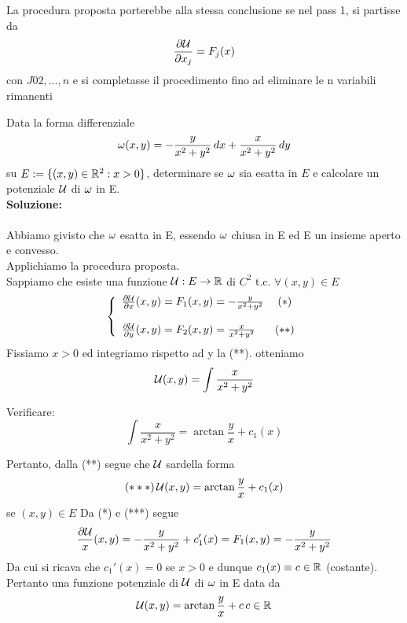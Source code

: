 \begin{osservazione}
  La procedura proposta porterebbe alla stessa conclusione se nel pass 1, si partisse da 
  $$\frac{\partial \mathcal{U}}{\partial x_j} = F_j(x)$$
  con $J02,...,n$
  e si completasse il procedimento fino ad eliminare le n variabili rimanenti
\end{osservazione}
\begin{exercise}
  Data la forma differenziale
  $$\omega(x,y) = -\frac{y}{x^2+y^2}\,dx + \frac{x}{x^2+y^2}\,dy$$
  su $E:=\{(x,y)\in\mathbb{R}^2: x>0\}$, determinare se $\omega$ sia esatta in $E$ e calcolare 
  un potenziale $\mathcal{U}$ di $\omega$ in E. \\
  \textbf{Soluzione:} \\\\
  Abbiamo gi\aca visto che $\omega$ \ace esatta in E, essendo $\omega$ chiusa in E ed 
  E un insieme aperto e convesso. \\
  Applichiamo la procedura proposta. \\
  Sappiamo che esiste una funzione $\mathcal{U}:E\to\mathbb{R}$ di $C^2$ t.c. $\forall (x,y)\in E$
  $$\left\{\begin{array}{lc}
    \frac{\partial\mathcal{U}}{\partial x}(x,y) = F_1(x,y) = -\frac{y}{x^2+y^2} & (*) \\
    \\
    \frac{\partial\mathcal{U}}{\partial y}(x,y) = F_2(x,y) = \frac{x}{x^2+y^2} & (**) \\
  \end{array}\right.$$
  Fissiamo $x>0$ ed integriamo rispetto ad y la (**). otteniamo
  $$\mathcal{U}(x,y) = \int \frac{x}{x^2+y^2}$$
  \begin{exercise}
    Verificare:
    $$\int \frac{x}{x^2+y^2} = \arctan\frac{y}{x} + c_1(x)$$
  \end{exercise}
  Pertanto, dalla (**) segue che $\mathcal{U}$ sar\aca della forma 
  $$(***)\, \mathcal{U}(x,y) = \arctan\frac{y}{x} + c_1(x)$$
  se $(x,y)\in E$
  Da (*) e (***) segue
  $$\frac{\partial\mathcal{U}}{x}(x,y) = -\frac{y}{x^2+y^2} + c_1'(x) = F_1(x,y) = -\frac{y}{x^2+y^2}$$
  Da cui si ricava che $c_1'(x)=0$ se $x>0$ e dunque $c_1(x) \equiv c \in \mathbb{R}$ (costante). 
  Pertanto una funzione potenziale di $\mathcal{U}$ di $\omega$ in E \ace data da 
  $$\mathcal{U}(x,y) = \arctan\frac{y}{x}+c \, c\in\mathbb{R}$$
\end{exercise}
 